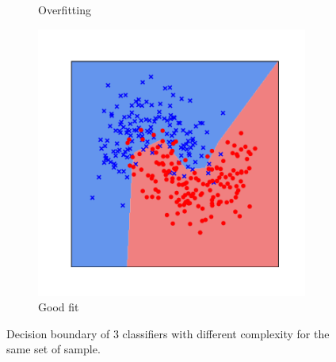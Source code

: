 \begin{figure}[h]
\begin{subfigure}[b]{0.32\textwidth}
    \caption{Overfitting}
    \label{figure:ch2-fitting_points_b}
  \end{subfigure}
  \hfill
  \begin{subfigure}[b]{0.32\textwidth}
    \includegraphics[width=0.98\textwidth]{figures/main/ch2-background/normal.pdf}
    \caption{Good fit}
    \label{figure:ch2-fitting_points_c}
  \end{subfigure}
  \caption{
    Decision boundary of 3 classifiers with different complexity for the same set of sample.
  }
  \label{figure:ch2-fitting_points}
\end{figure}


